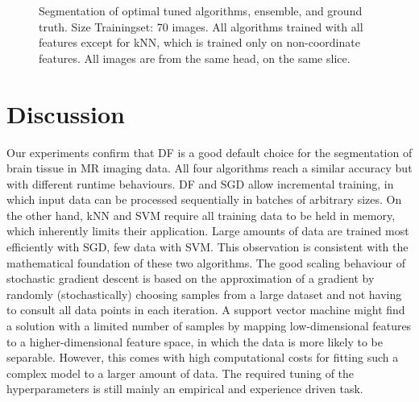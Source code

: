 \documentclass[journal]{IEEEtran}
\begin{document}
\begin{figure}[h!]
	\hfill
	\caption{Segmentation of optimal tuned algorithms, ensemble, and ground truth. Size Trainingset: 70 images. All algorithms trained with all features except for kNN, which is trained only on non-coordinate features. All images are from the same head, on the same slice. }
	\label{f.slices_all}
\end{figure}

\section{Discussion}

Our experiments confirm that DF is a good default choice for the segmentation of brain tissue in MR imaging data. All four algorithms reach a similar accuracy but with different runtime behaviours. DF and SGD allow incremental training, in which input data can be processed sequentially in batches of arbitrary sizes. On the other hand, kNN and SVM require all training data to be held in memory, which inherently limits their application. Large amounts of data are trained most efficiently with SGD, few data with SVM. This observation is consistent with the mathematical foundation of these two algorithms. The good scaling behaviour of stochastic gradient descent is based on the approximation of a gradient by randomly (stochastically) choosing samples from a large dataset and not having to consult all data points in each iteration. A support vector machine might find a solution with a limited number of samples by mapping low-dimensional features to a higher-dimensional feature space, in which the data is more likely to be separable. However, this comes with high computational costs for fitting such a complex model to a larger amount of data. The required tuning of the hyperparameters is still mainly an empirical and experience driven task.
\end{document}
